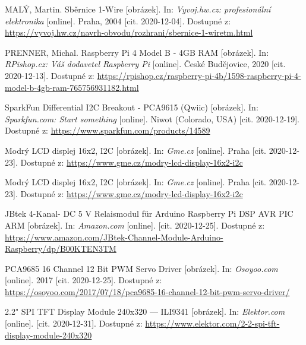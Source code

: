 \begin{thebibliography}{3}
MALÝ, Martin. Sběrnice 1-Wire [obrázek]. In: \textit{Vyvoj.hw.cz: profesionální elektronika} [online]. Praha, 2004 [cit. 2020-12-04]. Dostupné z: \url{https://vyvoj.hw.cz/navrh-obvodu/rozhrani/sbernice-1-wiretm.html}


PRENNER, Michal. Raspberry Pi 4 Model B - 4GB RAM [obrázek]. In: \textit{RPishop.cz: Váš dodavetel Raspberry Pi} [online]. České Budějovice, 2020 [cit. 2020-12-13]. Dostupné z: \url{https://rpishop.cz/raspberry-pi-4b/1598-raspberry-pi-4-model-b-4gb-ram-765756931182.html}





SparkFun Differential I2C Breakout - PCA9615 (Qwiic) [obrázek]. In: \textit{Sparkfun.com: Start something} [online]. Niwot (Colorado, USA) [cit. 2020-12-19]. Dostupné z: \url{https://www.sparkfun.com/products/14589}

Modrý LCD displej 16x2, I2C [obrázek]. In: \textit{Gme.cz} [online]. Praha [cit. 2020-12-23]. Dostupné z: \url{https://www.gme.cz/modry-lcd-display-16x2-i2c}

Modrý LCD displej 16x2, I2C [obrázek]. In: \textit{Gme.cz} [online]. Praha [cit. 2020-12-23]. Dostupné z: \url{https://www.gme.cz/modry-lcd-display-16x2-i2c}

JBtek 4-Kanal- DC 5 V Relaismodul für Arduino Raspberry Pi DSP AVR PIC ARM [obrázek]. In: \textit{Amazon.com} [online]. [cit. 2020-12-25]. Dostupné z: \url{https://www.amazon.com/JBtek-Channel-Module-Arduino-Raspberry/dp/B00KTEN3TM}



PCA9685 16 Channel 12 Bit PWM Servo Driver [obrázek]. In: \textit{Osoyoo.com} [online]. 2017 [cit. 2020-12-25]. Dostupné z: \url{https://osoyoo.com/2017/07/18/pca9685-16-channel-12-bit-pwm-servo-driver/}


2.2" SPI TFT Display Module 240x320 --- ILI9341 [obrázek]. In: \textit{Elektor.com} [online]. [cit. 2020-12-31]. Dostupné z: \url{https://www.elektor.com/2-2-spi-tft-display-module-240x320}










\end{thebibliography}